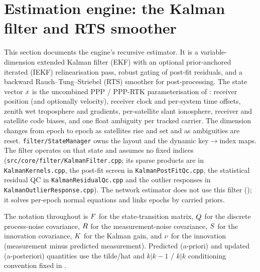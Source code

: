\documentclass[main.tex]{subfiles}
\begin{document}
\section{Estimation engine: the Kalman filter and RTS smoother}\label{sec:kf}

This section documents the engine's recursive estimator.  It is a
variable-dimension extended Kalman filter (EKF) with an optional
prior-anchored iterated (IEKF) relinearisation pass, robust gating of
post-fit residuals, and a backward Rauch--Tung--Striebel (RTS) smoother
for post-processing.  The state vector $x$ is the uncombined PPP /
PPP-RTK parameterisation of : receiver position (and optionally
velocity), receiver clock and per-system time offsets, zenith wet
troposphere and gradients, per-satellite slant ionosphere, receiver and
satellite code biases, and one float ambiguity per tracked
carrier.  The dimension changes from epoch to epoch as satellites rise
and set and as ambiguities are reset.  \texttt{filter/StateManager} owns
the layout and the dynamic key$\to$index maps.  The filter operates on
that state and assumes no fixed indices
(\texttt{src/core/filter/KalmanFilter.cpp}; its sparse products are in
\texttt{KalmanKernels.cpp}, the post-fit screen in \texttt{KalmanPostFitQc.cpp},
the statistical residual QC in \texttt{KalmanResidualQc.cpp} and the outlier
responses in \texttt{KalmanOutlierResponse.cpp}).  The network estimator does
not use this filter (); it
solves per-epoch normal equations and links epochs by carried priors.

The notation throughout is $F$ for the state-transition matrix, $Q$
for the discrete process-noise covariance, $R$ for the
measurement-noise covariance, $S$ for the innovation covariance,
$K$ for the Kalman gain, and $\nu$ for the innovation
(measurement minus predicted measurement).  Predicted (a-priori) and
updated (a-posteriori) quantities use the tilde/hat and $k|k{-}1$ /
$k|k$ conditioning convention fixed in .
\end{document}
